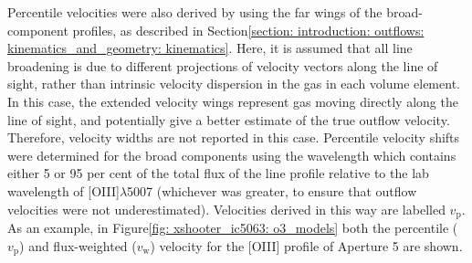 Percentile velocities were also derived by using the far wings of the broad-component profiles, as described in Section\;\ref{section: introduction: outflows: kinematics_and_geometry: kinematics}. Here, it is assumed that all line broadening is due to different projections of velocity vectors along the line of sight, rather than intrinsic velocity dispersion in the gas in each volume element. In this case, the extended velocity wings represent gas moving directly along the line of sight, and potentially give a better estimate of the true outflow velocity. Therefore, velocity widths are not reported in this case. Percentile velocity shifts were determined for the broad components using the wavelength which contains either 5 or 95 per cent of the total flux of the line profile relative to the lab wavelength of [OIII]$\lambda$5007 (whichever was greater, to ensure that outflow velocities were not underestimated). Velocities derived in this way are labelled $v_\mathrm{p}$. As an example, in Figure\;\ref{fig: xshooter_ic5063: o3_models} both the percentile ($v_\mathrm{p}$) and flux-weighted ($v_\mathrm{w}$) velocity for the [OIII] profile of Aperture 5 are shown.

